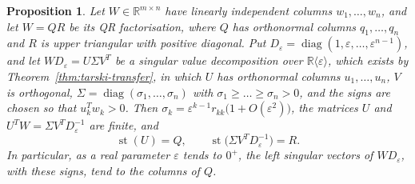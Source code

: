 \documentclass[12pt, a4paper]{report}
\theoremstyle{plain}
\newtheorem{proposition}[theorem]{Proposition}
\theoremstyle{definition}
\theoremstyle{remark}
\theoremstyle{plain}
\newcommand{\RR}{\mathbb{R}}
\newcommand{\st}{\operatorname{st}}
\DeclareMathOperator{\diag}{diag}
\begin{document}
\begin{proposition}\label{prop:qr-from-svd}
Let $W\in\RR^{m\times n}$ have linearly independent columns $w_1,\dots,w_n$, and let $W=QR$ be its QR factorisation, where $Q$ has orthonormal columns $q_1,\dots,q_n$ and $R$ is upper triangular with positive diagonal. Put $D_\varepsilon=\diag(1,\varepsilon,\dots,\varepsilon^{n-1})$, and let $WD_\varepsilon=U\Sigma V^T$ be a singular value decomposition over $\RR\langle\varepsilon\rangle$, which exists by Theorem~\ref{thm:tarski-transfer}, in which $U$ has orthonormal columns $u_1,\dots,u_n$, $V$ is orthogonal, $\Sigma=\diag(\sigma_1,\dots,\sigma_n)$ with $\sigma_1\geq\dots\geq\sigma_n>0$, and the signs are chosen so that $u_k^Tw_k>0$. Then $\sigma_k=\varepsilon^{k-1}r_{kk}\bigl(1+O(\varepsilon^2)\bigr)$, the matrices $U$ and $U^TW=\Sigma V^TD_\varepsilon^{-1}$ are finite, and
\[ \st(U)=Q,\qquad \st\bigl(\Sigma V^TD_\varepsilon^{-1}\bigr)=R. \]
In particular, as a real parameter $\varepsilon$ tends to $0^+$, the left singular vectors of $WD_\varepsilon$, with these signs, tend to the columns of $Q$.
\end{proposition}
\end{document}
